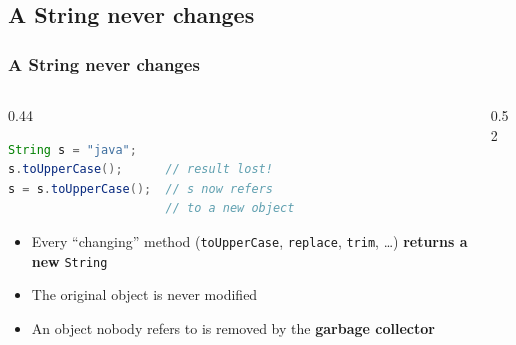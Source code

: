 \documentclass[aspectratio=169,10pt,compress]{beamer}
\begin{document}

\subsection[Never]{A String never changes}




\begin{frame}[t,fragile] \frametitle{A String never changes}
  \begin{columns}[T]
    \begin{column}{0.44\textwidth}


\begin{lstlisting}[style=codesnippet, language=Java]
String s = "java";
s.toUpperCase();      // result lost!
s = s.toUpperCase();  // s now refers
                      // to a new object
\end{lstlisting}



      \begin{itemize}\small
        \item Every ``changing'' method (\texttt{toUpperCase}, \texttt{replace}, \texttt{trim}, \dots)
              \textbf{returns a new} \texttt{String}
        \item The original object is never modified
        \item An object nobody refers to is removed by the \textbf{garbage collector}
      \end{itemize}
    \end{column}
    \begin{column}{0.52\textwidth}
      \begin{center}
\end{center}
\end{column}
\end{columns}
\end{frame}
\end{document}
